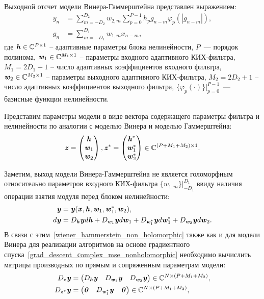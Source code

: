 Выходной отсчет модели Винера-Гаммерштейна представлен выражением:
\begin{align}
	y_n&=\sum_{m=-D_2}^{D_2}w_{2,m}\sum_{p=0}^{P-1}h_pg_{n-m}\varphi_p(|g_{n-m}|), \nonumber \\
	g_n&=\sum_{m=-D_1}^{D_1}w_{1,m}x_{n-m},
	\label{wiener_hammerstein_output}
\end{align}
где $\textbf{\textit{h}}\in\mathbb{C}^{P\times 1}$ -- адаптивные параметры блока нелинейности, $P$~--- порядок полинома, $\textbf{\textit{w}}_1\in\mathbb{C}^{M_1\times 1}$ -- параметры входного адаптивного КИХ-фильтра, $M_1=2D_1+1$ -- число адаптивных коэффициентов входного фильтра, $\textbf{\textit{w}}_2\in\mathbb{C}^{M_2\times 1}$ -- параметры выходного адаптивного КИХ-фильтра, $M_2=2D_2+1$ -- число адаптивных коэффициентов выходного фильтра, $\{\varphi_p(\cdot)\} \bigr|_{p=0}^{P-1}$~--- базисные функции нелинейности.

Представим параметры модели в виде вектора содержащего параметры фильтра и нелинейности по аналогии с моделью Винера и моделью Гаммерштейна:
\begin{equation}
	\textbf{\textit{z}}=\begin{pmatrix}
		\textbf{\textit{h}} \\ \textbf{\textit{w}}_1 \\ \textbf{\textit{w}}_2
	\end{pmatrix},
	\textbf{\textit{z}}^*=\begin{pmatrix}
		\textbf{\textit{h}}^* \\ \textbf{\textit{w}}_1^* \\ \textbf{\textit{w}}_2^*
	\end{pmatrix}
	\in\mathbb{C}^{(P+M_1+M_2)\times 1}.
	\label{wiener_hammerst_full_param_vect}
\end{equation}

Заметим, выход модели Винера-Гаммерштейна не является голоморфным относительно параметров входного КИХ-фильтра $\{w_{1,m}\} \bigr|_{-D_1}^{D_1}$ ввиду наличия операции взятия модуля перед блоком нелинейности:
\begin{align}
	\textbf{\textit{y}}&=\textbf{\textit{y}}(\textbf{\textit{x}}, \textbf{\textit{h}}, \textbf{\textit{w}}_1, \textbf{\textit{w}}_1^*, \textbf{\textit{w}}_2), \\
	d\textbf{\textit{y}}&=D_{\textbf{\textit{h}}}\textbf{\textit{y}}d\textbf{\textit{h}}+D_{\textbf{\textit{w}}_1}\textbf{\textit{y}}d\textbf{\textit{w}}_1+D_{\textbf{\textit{w}}_1^*}\textbf{\textit{y}}d\textbf{\textit{w}}_1^*+D_{\textbf{\textit{w}}_2}\textbf{\textit{y}}d\textbf{\textit{w}}_2.
	\label{wiener_hammerstein_non_holomorphic}
\end{align}
В связи с этим~\eqref{wiener_hammerstein_non_holomorphic} также как и для модели Винера для реализации алгоритмов на основе градиентного спуска~\eqref{grad_descent_сomplex_mse_nonholomorphic} необходимо вычислить матрицы производных по прямым и сопряженным параметрам модели:
\begin{align}
	D_{\textbf{\textit{z}}}\textbf{\textit{y}}&=\begin{pmatrix}
		D_{\textbf{\textit{h}}}\textbf{\textit{y}} & D_{\textbf{\textit{w}}_1}\textbf{\textit{y}} & D_{\textbf{\textit{w}}_2}\textbf{\textit{y}}
	\end{pmatrix}
	\in\mathbb{C}^{N\times(P+M_1+M_2)}, \nonumber \\
	D_{\textbf{\textit{z}}^*}\textbf{\textit{y}}&=\begin{pmatrix}
		\textbf{\textit{0}} & D_{\textbf{\textit{w}}_1^*}\textbf{\textit{y}} & \textbf{\textit{0}}
	\end{pmatrix}
	\in\mathbb{C}^{N\times(P+M_1+M_2)},
	\label{wiener_hammerstein_jacobian_full_general}
\end{align}

